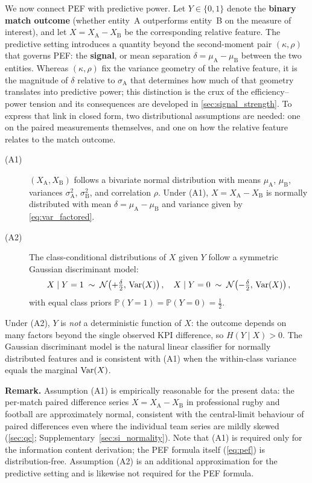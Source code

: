 We now connect PEF with predictive power. Let $Y\in\{0,1\}$ denote the \textbf{binary match outcome} (whether entity~A outperforms entity~B on the measure of interest), and let $X=X_{\mathrm{A}}-X_{\mathrm{B}}$ be the corresponding relative feature. The predictive setting introduces a quantity beyond the second-moment pair $(\kappa,\rho)$ that governs PEF: the \textbf{signal}, or mean separation $\delta=\mu_{\mathrm{A}}-\mu_{\mathrm{B}}$ between the two entities. Whereas $(\kappa,\rho)$ fix the variance geometry of the relative feature, it is the magnitude of $\delta$ relative to $\sigma_{\mathrm{A}}$ that determines how much of that geometry translates into predictive power; this distinction is the crux of the efficiency--power tension and its consequences are developed in \cref{sec:signal_strength}. To express that link in closed form, two distributional assumptions are needed: one on the paired measurements themselves, and one on how the relative feature relates to the match outcome.

\begin{description}
  \item[(A1)] $(X_{\mathrm{A}},X_{\mathrm{B}})$ follows a bivariate normal distribution with means $\mu_{\mathrm{A}}$, $\mu_{\mathrm{B}}$, variances $\sigma^{2}_{\mathrm{A}}$, $\sigma^{2}_{\mathrm{B}}$, and correlation $\rho$. Under (A1), $X=X_{\mathrm{A}}-X_{\mathrm{B}}$ is normally distributed with mean $\delta=\mu_{\mathrm{A}}-\mu_{\mathrm{B}}$ and variance given by \cref{eq:var_factored}.
  \item[(A2)] The class-conditional distributions of $X$ given $Y$ follow a symmetric Gaussian discriminant model:
  \[
    X \mid Y=1 \;\sim\; \mathcal{N}\!\left(+\tfrac{\delta}{2},\,\operatorname{Var}(X)\right),
    \quad
    X \mid Y=0 \;\sim\; \mathcal{N}\!\left(-\tfrac{\delta}{2},\,\operatorname{Var}(X)\right),
  \]
  with equal class priors $\mathbb{P}(Y=1)=\mathbb{P}(Y=0)=\tfrac{1}{2}$.
\end{description}

Under (A2), $Y$ is \emph{not} a deterministic function of $X$: the outcome depends on many factors beyond the single observed KPI difference, so $H(Y\mid X)>0$. The Gaussian discriminant model is the natural linear classifier for normally distributed features and is consistent with (A1) when the within-class variance equals the marginal $\operatorname{Var}(X)$.

\medskip
\noindent\textbf{Remark.} Assumption (A1) is empirically reasonable for the present data: the per-match paired difference series $X=X_{\mathrm{A}}-X_{\mathrm{B}}$ in professional rugby and football are approximately normal, consistent with the central-limit behaviour of paired differences even where the individual team series are mildly skewed (\cref{sec:qc}; Supplementary~\cref{sec:si_normality}). Note that (A1) is required only for the information content derivation; the PEF formula itself (\cref{eq:pef}) is distribution-free. Assumption (A2) is an additional approximation for the predictive setting and is likewise not required for the PEF formula.

